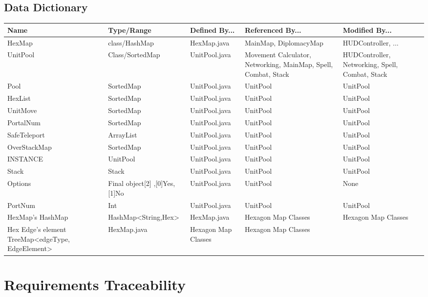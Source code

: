 \documentclass[12pt,a4paper,titlepage]{article}
\begin{document}
\subsection{Data Dictionary}
\small{
\begin{center}
\keepXColumns
\noindent\begin{tabularx}{\linewidth}{|l|X|X|X|X|}\hline
\textbf{Name} & \textbf{Type/Range} & \textbf{Defined By...} & \textbf{Referenced By...} & \textbf{Modified By...}\\
\hline
HexMap & class/HashMap & HexMap.java & MainMap, DiplomacyMap & HUDController, ...\\
\hline
UnitPool & Class/SortedMap & UnitPool.java & Movement Calculator, Networking, MainMap, Spell, Combat, Stack & HUDController, Networking, Spell, Combat, Stack\\
\hline
Pool & SortedMap & UnitPool.java & UnitPool & UnitPool\\
\hline
HexList & SortedMap & UnitPool.java & UnitPool & UnitPool\\
\hline
UnitMove & SortedMap & UnitPool.java & UnitPool & UnitPool\\
\hline
PortalNum & SortedMap & UnitPool.java & UnitPool & UnitPool\\
\hline
SafeTeleport & ArrayList & UnitPool.java & UnitPool & UnitPool\\
\hline
OverStackMap & SortedMap & UnitPool.java & UnitPool & UnitPool\\
\hline
INSTANCE & UnitPool & UnitPool.java & UnitPool & UnitPool\\
\hline
Stack & Stack & UnitPool.java & UnitPool & UnitPool\\
\hline
Options & Final object[2] ,[0]Yes, [1]No & UnitPool.java & UnitPool & None\\
\hline
PortNum & Int & UnitPool.java & UnitPool & UnitPool\\
\hline

HexMap's HashMap & HashMap<String,Hex> & HexMap.java & Hexagon Map Classes & Hexagon Map Classes\\
\hline
Hex Edge's element TreeMap<edgeType, EdgeElement> & HexMap.java & Hexagon Map Classes & Hexagon Map Classes\\
\hline
\end{tabularx}
\end{center}
}
	
\section{Requirements Traceability}
\end{document}
